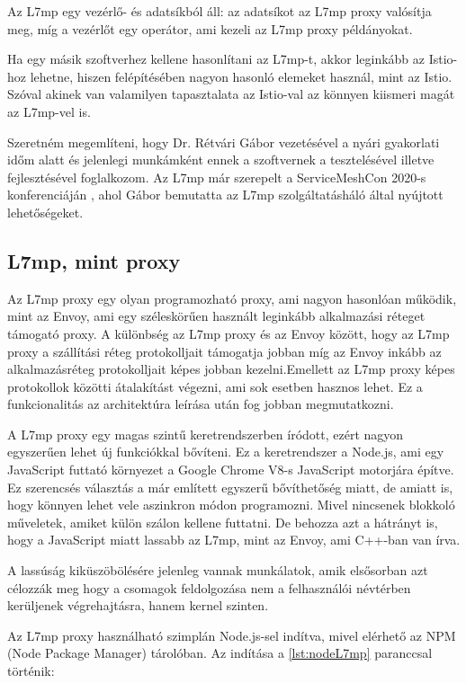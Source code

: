 Az L7mp egy vezérlő- és adatsíkból áll: az adatsíkot az L7mp proxy valósítja meg, míg a 
vezérlőt egy operátor, ami kezeli az L7mp proxy példányokat.

Ha egy másik szoftverhez kellene hasonlítani az L7mp-t, akkor leginkább az Istio-hoz 
lehetne, hiszen felépítésében nagyon hasonló elemeket használ, mint az Istio. Szóval 
akinek van valamilyen tapasztalata az Istio-val az könnyen kiismeri magát az L7mp-vel is.

Szeretném megemlíteni, hogy Dr. Rétvári Gábor vezetésével a nyári gyakorlati időm alatt 
és jelenlegi munkámként ennek a szoftvernek a tesztelésével  illetve fejlesztésével 
foglalkozom. Az L7mp már szerepelt a ServiceMeshCon 2020-s konferenciáján 
\cite{servicemeshcon_2020}, ahol Gábor bemutatta az L7mp szolgáltatásháló által nyújtott 
lehetőségeket. 

\subsection{L7mp, mint proxy}

Az L7mp proxy egy olyan programozható proxy, ami nagyon hasonlóan működik, mint az Envoy, 
ami egy széleskörűen használt leginkább alkalmazási réteget támogató proxy. A különbség 
az L7mp proxy és az Envoy között, hogy az L7mp proxy a szállítási réteg protokolljait  
támogatja jobban míg az Envoy inkább az alkalmazásréteg protokolljait képes jobban  
kezelni.Emellett az L7mp proxy képes protokollok közötti átalakítást végezni, ami sok 
esetben hasznos lehet. Ez a funkcionalitás az architektúra leírása után fog jobban 
megmutatkozni.

A L7mp proxy egy magas szintű keretrendszerben íródott, ezért nagyon egyszerűen 
lehet új funkciókkal bővíteni. Ez a keretrendszer a Node.js, ami egy JavaScript
futtató környezet a Google Chrome V8-s JavaScript motorjára építve. Ez szerencsés 
választás a már említett egyszerű bővíthetőség miatt, de amiatt is, hogy
könnyen lehet vele aszinkron módon programozni. Mivel nincsenek blokkoló műveletek,
amiket külön szálon kellene futtatni. De behozza azt a hátrányt is, hogy a 
JavaScript miatt lassabb az L7mp, mint az Envoy, ami C++-ban van írva. 

A lassúság kiküszöbölésére jelenleg vannak munkálatok, amik elsősorban azt 
célozzák meg hogy a csomagok feldolgozása nem a felhasználói névtérben kerüljenek
végrehajtásra, hanem kernel szinten. 

Az L7mp proxy használható szimplán Node.js-sel indítva, mivel elérhető az NPM (Node 
Package Manager) tárolóban. Az indítása a \ref{lst:nodeL7mp} paranccsal történik: 

